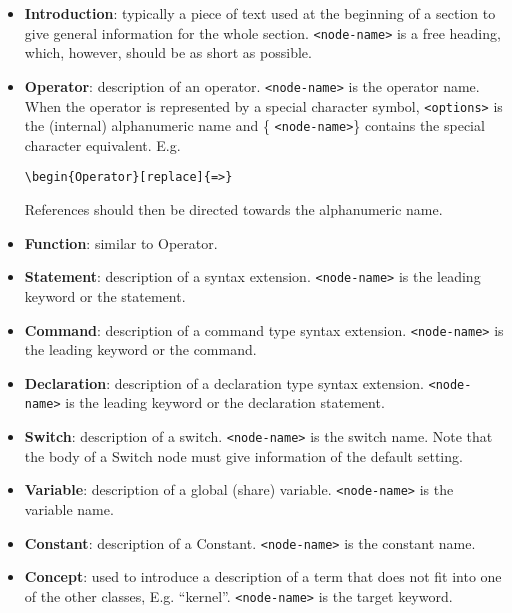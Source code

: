 \begin{itemize}
\item  {\bf Introduction}: typically a piece of text used at the beginning
of a section to give general information for the whole section. 
\verb|<node-name>| is a free heading, which, however, should be as short as
possible.

\item  {\bf Operator}: description of an operator. \verb|<node-name>| is the
operator name. When the operator is represented by a special character
symbol, \verb|<options>| is the (internal) alphanumeric name and \{%
\verb|<node-name>|\} contains the special character equivalent. E.g. 
\begin{verbatim}
\begin{Operator}[replace]{=>}
\end{verbatim}
References should then be directed towards the alphanumeric name.

\item  {\bf Function}: similar to Operator.

\item  {\bf Statement}: description of a syntax extension. \verb|<node-name>|
is the leading keyword or the statement.

\item  {\bf Command}: description of a command type syntax extension. 
\verb|<node-name>| is the leading keyword or the command.

\item  {\bf Declaration}: description of a declaration type syntax
extension. \verb|<node-name>| is the leading keyword or the declaration
statement.

\item  {\bf Switch}: description of a switch. \verb|<node-name>| is the
switch name. Note that the body of a Switch node must give information of
the default setting.

\item  {\bf Variable}: description of a global (share) variable. 
\verb|<node-name>| is the variable name.

\item  {\bf Constant}: description of a Constant. \verb|<node-name>| is the
constant name.

\item  {\bf Concept}: used to introduce a description of a term that does
not fit into one of the other classes, E.g. ``kernel''. \verb|<node-name>|
is the target keyword.
\end{itemize}

